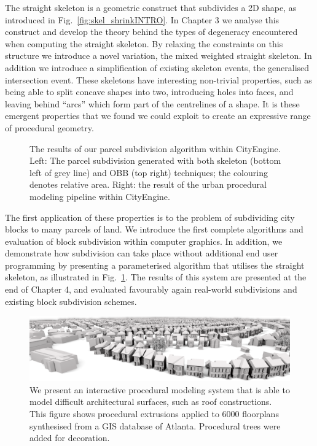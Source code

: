 The straight skeleton is a geometric construct that subdivides a 2D shape, as introduced in Fig.~\ref{fig:skel_shrinkINTRO}. In Chapter 3 we analyse this construct and develop the theory behind the types of degeneracy encountered when computing the straight skeleton. By relaxing the constraints on this structure we introduce a novel variation, the mixed weighted straight skeleton. In addition we introduce a simplification of existing skeleton events, the generalised intersection event. These skeletons have interesting non-trivial properties, such as being able to split concave shapes into two, introducing holes into faces, and leaving behind ``arcs'' which form part of the centrelines of a shape. It is these emergent properties that we found we could exploit to create an expressive range of procedural geometry. 

\begin{figure}
\centering
\def\svgwidth{1.0\columnwidth}

\caption[CityEngine results]{\label{fig:cityEngineINTRO}The results of our parcel subdivision algorithm within CityEngine. Left: The parcel subdivision generated with both skeleton (bottom left of grey line) and OBB (top right) techniques; the colouring denotes relative area. Right: the result of the urban procedural modeling pipeline within CityEngine.}
\end{figure}

The first application of these properties is to the problem of subdividing city blocks to many parcels of land. We introduce the first complete algorithms and evaluation of block subdivision within computer graphics. In addition, we demonstrate how subdivision can take place without additional end user programming by presenting a parameterised algorithm that utilises the straight skeleton, as illustrated in Fig.~\ref{fig:cityEngineINTRO}. The results of this system are presented at the end of Chapter 4, and evaluated favourably again real-world subdivisions and existing block subdivision schemes.


\begin{figure}
  \centering
  \includegraphics[width=1.0\columnwidth]{strip.png}
  \caption[Large scale GIS results]{\label{fig:StripINTRO} We present an interactive procedural modeling system that is able to model difficult architectural surfaces, such as roof constructions. This figure shows procedural extrusions applied to 6000 floorplans  synthesised from a GIS database of Atlanta. Procedural trees were added for decoration.}
\label{fig:teaser}
\end{figure}


